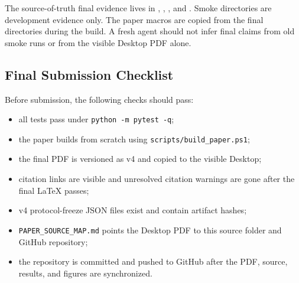 \documentclass{article}
\begin{document}
The source-of-truth final evidence lives in ,
, , and .
Smoke directories are development evidence only. The paper macros are copied
from the final directories during the build. A fresh agent should not infer
final claims from old smoke runs or from the visible Desktop PDF alone.

\subsection{Final Submission Checklist}

Before submission, the following checks should pass:
\begin{itemize}
    \item all tests pass under \texttt{python -m pytest -q};
    \item the paper builds from scratch using \texttt{scripts/build\_paper.ps1};
    \item the final PDF is versioned as v4 and copied to the visible Desktop;
    \item citation links are visible and unresolved citation warnings are gone
    after the final LaTeX passes;
    \item v4 protocol-freeze JSON files exist and contain artifact hashes;
    \item \texttt{PAPER\_SOURCE\_MAP.md} points the Desktop PDF to this source
    folder and GitHub repository;
    \item the repository is committed and pushed to GitHub after the PDF,
    source, results, and figures are synchronized.
\end{itemize}
\end{document}
